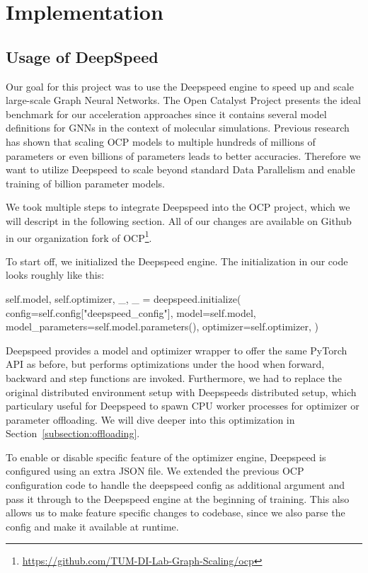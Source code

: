\section{Implementation}
\label{section:implementation}

\subsection{Usage of DeepSpeed}

Our goal for this project was to use the Deepspeed engine to speed up and scale 
large-scale Graph Neural Networks. The Open Catalyst Project presents the ideal 
benchmark for our acceleration approaches since it contains several model definitions 
for GNNs in the context of molecular simulations. Previous research has shown 
that scaling OCP models to multiple hundreds of millions of parameters or even 
billions of parameters leads to better accuracies. Therefore we want to utilize 
Deepspeed to scale beyond standard Data Parallelism and enable training of billion 
parameter models.

We took multiple steps to integrate Deepspeed into the OCP project, which we will 
descript in the following section. All of our changes are available on Github in our 
organization fork of OCP\footnote{\url{https://github.com/TUM-DI-Lab-Graph-Scaling/ocp}}.

To start off, we initialized the Deepspeed engine. 
The initialization in our code looks roughly like this:

\begin{python}
self.model, self.optimizer, _, _ = deepspeed.initialize(
                    config=self.config["deepspeed_config"],
                    model=self.model,
                    model_parameters=self.model.parameters(),
                    optimizer=self.optimizer,
                )
\end{python}

Deepspeed provides a model and optimizer wrapper to offer the same PyTorch API as 
before, but performs optimizations under the hood when forward, backward and step 
functions are invoked. Furthermore, we had to replace the original distributed 
environment setup with Deepspeeds distributed setup, which particulary useful for 
Deepspeed to spawn CPU worker processes for optimizer or parameter offloading. We 
will dive deeper into this optimization in Section~\ref{subsection:offloading}.

To enable or disable specific feature of the optimizer engine, Deepspeed is 
configured using an extra JSON file. We extended the previous OCP configuration 
code to handle the deepspeed config as additional argument and pass it through 
to the Deepspeed engine at the beginning of training. This also allows us to 
make feature specific changes to codebase, since we also parse the config and 
make it available at runtime.

